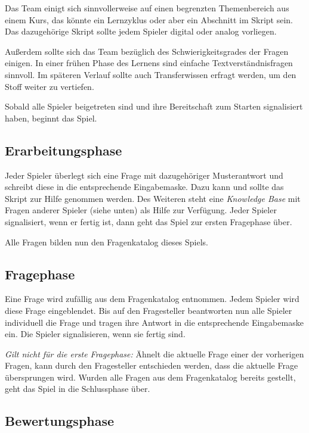 \documentclass[a4paper,11pt,listof=numbered,glossary=totoc,parskip=half,toc=bib]{scrreprt}
\begin{document}
Das Team einigt sich sinnvollerweise auf einen begrenzten Themenbereich aus einem Kurs, das könnte ein Lernzyklus oder aber ein Abschnitt im Skript sein. Das dazugehörige Skript sollte jedem Spieler digital oder analog vorliegen.

Außerdem sollte sich das Team bezüglich des Schwierigkeitsgrades der Fragen einigen. In einer frühen Phase des Lernens sind einfache Textverständnisfragen sinnvoll. Im späteren Verlauf sollte auch Transferwissen erfragt werden, um den Stoff weiter zu vertiefen.

Sobald alle Spieler beigetreten sind und ihre Bereitschaft zum Starten signalisiert haben, beginnt das Spiel. 



\subsection{Erarbeitungsphase}

Jeder Spieler überlegt sich eine Frage mit dazugehöriger \frqq{}Musterantwort\flqq{} und schreibt diese in die entsprechende Eingabemaske. Dazu kann und sollte das Skript zur Hilfe genommen werden. Des Weiteren steht eine \textit{Knowledge Base} mit Fragen anderer Spieler (siehe unten) als Hilfe zur Verfügung. Jeder Spieler signalisiert, wenn er fertig ist, dann geht das Spiel zur ersten Fragephase über.

Alle Fragen bilden nun den Fragenkatalog dieses Spiels.

\subsection{Fragephase}

Eine Frage wird zufällig aus dem Fragenkatalog entnommen. Jedem Spieler wird diese Frage eingeblendet. Bis auf den Fragesteller beantworten nun alle Spieler individuell die Frage und tragen ihre Antwort in die entsprechende Eingabemaske ein. Die Spieler signalisieren, wenn sie fertig sind.

\textit{Gilt nicht für die erste Fragephase:}
Ähnelt die aktuelle Frage einer der vorherigen Fragen, kann durch den Fragesteller entschieden werden, dass die aktuelle Frage übersprungen wird.
Wurden alle Fragen aus dem Fragenkatalog bereits gestellt, geht das Spiel in die Schlussphase über.

\subsection{Bewertungsphase}
\end{document}
